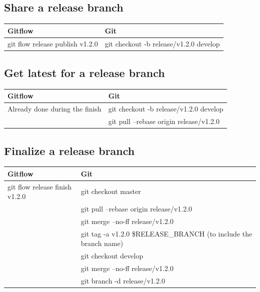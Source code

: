 \documentclass{tufte-handout}
\begin{document}
		\subsection{Share a release branch}
		
		\begin{table}[ht]
			\centering
			\selectfont
			\begin{tabular}{ll}
				\toprule
				Gitflow & Git \\
				\midrule
				git flow release publish v1.2.0 & git checkout -b
				release/v1.2.0 develop \\
				\bottomrule
			\end{tabular}
			\label{tab:normaltab}
		\end{table}
		\medskip %
		
		\subsection{Get latest for a release branch}
		
		\begin{table}[ht]
			\centering
			\selectfont
			\begin{tabular}{ll}
				\toprule
				Gitflow & Git \\
				\midrule
				Already done during the finish & git checkout -b release/v1.2.0 develop \\
				& git pull --rebase origin release/v1.2.0 \\
				\bottomrule
			\end{tabular}
			\label{tab:normaltab}
		\end{table}
		\medskip %
		
		\clearpage
		
		\subsection{Finalize a release branch}
		
		\begin{table}[ht]
			\centering
			\selectfont
			\begin{tabular}{ll}
				\toprule
				Gitflow & Git \\
				\midrule
				git flow release finish v1.2.0 & git checkout master \\
				& git pull --rebase origin release/v1.2.0 \\
				& git merge --no-ff release/v1.2.0 \\
				& git tag -a v1.2.0 \$RELEASE\_BRANCH (to include the branch name) \\
				& git checkout develop \\
				& git merge --no-ff release/v1.2.0 \\
				& git branch -d release/v1.2.0 \\ 
				\bottomrule
			\end{tabular}
			\label{tab:normaltab}
		\end{table}
		\medskip %
		
\end{document}

